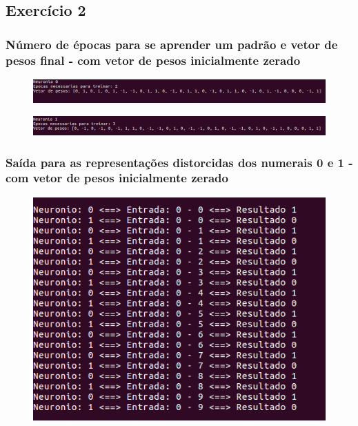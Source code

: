 \documentclass[hidelinks,12pt]{article}
\begin{document}
	\subsection{Exercício 2}
		
		\subsubsection{Número de épocas para se aprender um padrão e vetor de pesos final - com vetor de pesos inicialmente zerado}
		
		\begin{figure}[!h]
			\centering
			\includegraphics[scale=0.4]{Figures/E2PE0.png}
		\end{figure}
		
		\begin{figure}[!h]
			\centering
			\includegraphics[scale=0.4]{Figures/E2PE1.png}
		\end{figure}
		
		\newpage
		
		\subsubsection{Saída para as representações distorcidas dos numerais 0 e 1 - com vetor de pesos inicialmente zerado}
		
		\begin{figure}[!h]
			\centering
			\includegraphics[scale=0.7]{Figures/E2S0.png}
		\end{figure}
		
\end{document}

